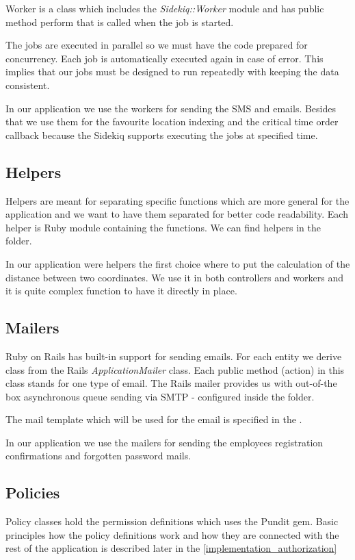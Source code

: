 		Worker is a class which includes the \textit{Sidekiq::Worker} module and has public method perform that is called when the job is started. 
		
		The jobs are executed in parallel so we must have the code prepared for concurrency. Each job is automatically executed again in case of error. This implies that our jobs must be designed to run repeatedly with keeping the data consistent.
		
		In our application we use the workers for sending the SMS and emails. Besides that we use them for the favourite location indexing and the critical time order callback because the Sidekiq supports executing the jobs at specified time.

	\subsection{Helpers}
		 Helpers are meant for separating specific functions which are more general for the application and we want to have them separated for better code readability. Each helper is Ruby module containing the functions. We can find helpers in the  folder.
		
		In our application were helpers the first choice where to put the calculation of the distance between two coordinates. We use it in both controllers and workers and it is quite complex function to have it directly in place.
		
	\subsection{Mailers}
		Ruby on Rails has built-in support for sending emails. For each entity we derive class from the Rails \textit{ApplicationMailer} class. Each public method (action) in this class stands for one type of email. The Rails mailer provides us with out-of-the box asynchronous queue sending via SMTP - configured inside the  folder.
		 
		 The mail template which will be used for the email is specified in the .
		 
		 In our application we use the mailers for sending the employees registration confirmations and forgotten password mails.

		
	\subsection{Policies}
		Policy classes hold the permission definitions which uses the Pundit gem. Basic principles how the policy definitions work and how they are connected with the rest of the application is described later in the \ref{implementation_authorization} 
